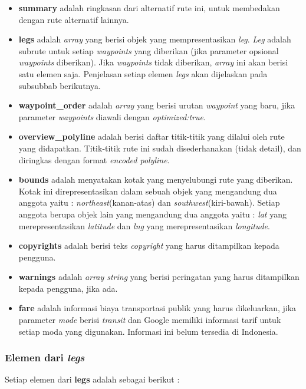 \begin{itemize}
	\item \textbf{summary} adalah ringkasan dari alternatif rute ini, untuk membedakan dengan rute alternatif lainnya.
	\item \textbf{legs} adalah \textit{array} yang berisi objek yang mempresentasikan \textit{leg}. \textit{Leg} adalah subrute untuk setiap \textit{waypoints} yang diberikan (jika parameter opsional \textit{waypoints} diberikan). Jika \textit{waypoints} tidak diberikan, \textit{array} ini akan berisi satu elemen saja. Penjelasan setiap elemen \textit{legs} akan dijelaskan pada subsubbab berikutnya.
	\item \textbf{waypoint\_order} adalah \textit{array} yang berisi urutan \textit{waypoint} yang baru, jika parameter \textit{waypoints} diawali dengan \textit{optimized:true}.
	\item \textbf{overview\_polyline} adalah berisi daftar titik-titik yang dilalui oleh rute yang didapatkan. Titik-titik rute ini sudah disederhanakan (tidak detail), dan diringkas dengan format \textit{encoded polyline}.
	\item \textbf{bounds} adalah menyatakan kotak yang menyelubungi rute yang diberikan. Kotak ini direpresentasikan dalam sebuah objek yang mengandung dua anggota yaitu : \textit{northeast}(kanan-atas) dan \textit{southwest}(kiri-bawah). Setiap anggota berupa objek lain yang mengandung dua anggota yaitu : \textit{lat} yang merepresentasikan \textit{latitude} dan \textit{lng} yang merepresentasikan \textit{longitude}.
	\item \textbf{copyrights} adalah berisi teks \textit{copyright} yang harus ditampilkan kepada pengguna.
	\item \textbf{warnings} adalah \textit{array string} yang berisi peringatan yang harus ditampilkan kepada pengguna, jika ada.
	\item \textbf{fare} adalah informasi biaya transportasi publik yang harus dikeluarkan, jika parameter \textit{mode} berisi \textit{transit} dan Google memiliki informasi tarif untuk setiap moda yang digunakan. Informasi ini belum tersedia di Indonesia.
\end{itemize}

\subsubsection{Elemen dari \textit{legs}}
\label{subsubsec:elemenlegs}

Setiap elemen dari \textbf{legs} adalah sebagai berikut :

